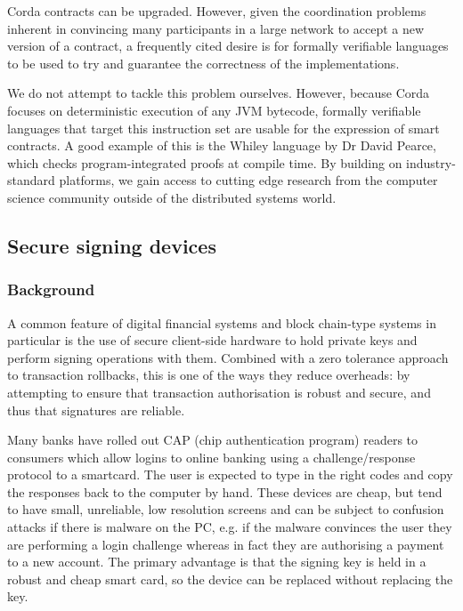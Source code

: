 \documentclass{article}
\begin{document}
Corda contracts can be upgraded. However, given the coordination problems inherent in convincing many participants
in a large network to accept a new version of a contract, a frequently cited desire is for formally verifiable
languages to be used to try and guarantee the correctness of the implementations.

We do not attempt to tackle this problem ourselves. However, because Corda focuses on deterministic execution of
any JVM bytecode, formally verifiable languages that target this instruction set are usable for the expression
of smart contracts. A good example of this is the Whiley language by Dr David Pearce\cite{Pearce2015191}, which
checks program-integrated proofs at compile time. By building on industry-standard platforms, we gain access to
cutting edge research from the computer science community outside of the distributed systems world.

\subsection{Secure signing devices}\label{sec:secure-signing-devices}

\subsubsection{Background}

A common feature of digital financial systems and block chain-type systems in particular is the use of secure
client-side hardware to hold private keys and perform signing operations with them. Combined with a zero tolerance
approach to transaction rollbacks, this is one of the ways they reduce overheads: by attempting to ensure that
transaction authorisation is robust and secure, and thus that signatures are reliable.

Many banks have rolled out CAP (chip authentication program) readers to consumers which allow logins to online
banking using a challenge/response protocol to a smartcard. The user is expected to type in the right codes and
copy the responses back to the computer by hand. These devices are cheap, but tend to have small, unreliable, low
resolution screens and can be subject to confusion attacks if there is malware on the PC, e.g. if the malware
convinces the user they are performing a login challenge whereas in fact they are authorising a payment to a new
account. The primary advantage is that the signing key is held in a robust and cheap smart card, so the device can
be replaced without replacing the key.
\end{document}
